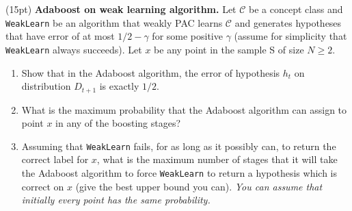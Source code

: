 \documentclass[11pt]{article}
\newcommand*{\C}{{\mathcal C}}
\DeclareMathOperator{\1}{\mathbbm{1}}
\begin{document}
\begin{problem}(15pt) \textbf{Adaboost on weak learning algorithm.}  
Let $\C$ be a concept class and {\tt WeakLearn} be an algorithm that weakly PAC
learns $\C$ and generates hypotheses that have error of at most $1/2-\gamma$
for some positive $\gamma$ (assume for simplicity that {\tt WeakLearn} always
succeeds). Let $x$ be any point in the sample S of size $N \geq 2$.
\begin{enumerate}
\item Show that in the Adaboost algorithm, the error of hypothesis $h_t$ on
distribution $D_{t+1}$ is exactly $1/2.$
\item What is the maximum probability that the Adaboost algorithm can assign to
point $x$ in any of the boosting stages?
\item Assuming  that {\tt WeakLearn} fails, for as long as it possibly can, to
return the correct label for $x$, what is the maximum number of stages that it
will take the Adaboost algorithm to force  {\tt WeakLearn} to return a
hypothesis which is correct on $x$ (give the best upper bound you can). {\em You
can assume that initially every point has the same probability.}
\end{enumerate}
\end{problem}
\end{document}
